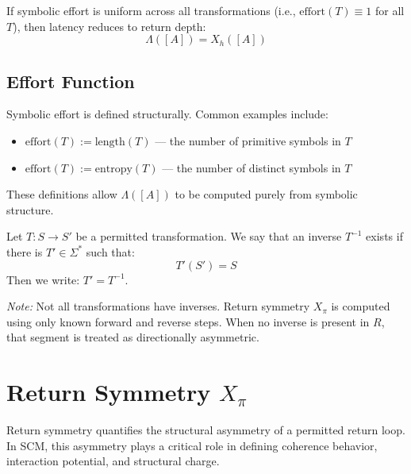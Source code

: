 If symbolic effort is uniform across all transformations (i.e., $\text{effort}(T) \equiv 1$ for all $T$), then latency reduces to return depth:
\begin{equation} \label{eq:latency-depth-equivalence}
\Lambda([A]) = X_h([A])
\end{equation}

\subsection{Effort Function} \label{effort-function}

Symbolic effort is defined structurally. Common examples include:
\begin{itemize}
  \item $\text{effort}(T) := \text{length}(T)$ — the number of primitive symbols in $T$
  \item $\text{effort}(T) := \text{entropy}(T)$ — the number of distinct symbols in $T$
\end{itemize}

These definitions allow $\Lambda([A])$ to be computed purely from symbolic structure.

\begin{definition} \label{def:inverse-transformation}
Let $T : S \rightarrow S'$ be a permitted transformation.  
We say that an inverse $T^{-1}$ exists if there is $T' \in \Sigma^*$ such that:
\begin{equation} \label{eq:inverse-transform}
T'(S') = S
\end{equation}
Then we write: $T' = T^{-1}$.
\end{definition}

\textit{Note:} Not all transformations have inverses.  
Return symmetry $X_\pi$ is computed using only known forward and reverse steps.  
When no inverse is present in $R$, that segment is treated as directionally asymmetric.
\section{Return Symmetry $X_\pi$}

Return symmetry quantifies the structural asymmetry of a permitted return loop.  
In SCM, this asymmetry plays a critical role in defining coherence behavior, interaction potential, and structural charge.

